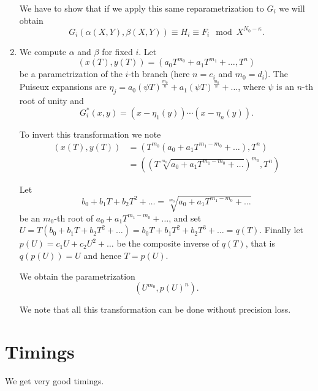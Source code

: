 \documentclass[a4paper,11pt,reqno]{amsart}%
\theoremstyle{definition}
\theoremstyle{plain}
\theoremstyle{remark}
\newcommand\ct[1]{\text{\rmfamily\upshape #1}}
\newcommand{\IntExpX}{\ct{IntExp}_X}
\newcommand{\IntExpY}{\ct{IntExp}_Y}
\begin{document}
\begin{enumerate}
We have to show that if we apply this same reparametrization to $G_i$ we will obtain
$$G_i(\alpha(X,Y), \beta(X,Y)) \equiv H_i \equiv F_i \mod X^{N_0 - \kappa}.$$

\item We compute $\alpha$ and $\beta$ for fixed $i$.
Let
$$(x(T), y(T)) = (a_0 T^{m_0} + a_1 T^{m_1} + \dots, T^n)$$
be a parametrization of the $i$-th branch (here $n = e_i$ and $m_0 = d_i$). The Puiseux expansions are $\eta_j = a_0 (\psi T)^{\frac{m_0}{n}} +  a_1 (\psi T)^{\frac{m_0}{n}} + \dots$, where $\psi$ is an $n$-th root of unity and
$$
G_i^*(x, y) = (x - \eta_1(y)) \cdots (x - \eta_n(y)).
$$

To invert this transformation we note
\begin{align*}
(x(T), y(T)) &= (T^{m_0} (a_0 + a_1 T^{m_1 - m_0} + \dots), T^n) \\
             &= \left(\left(T \sqrt[m_0]{a_0 + a_1 T^{m_1 - m_0} + \dots}\right)^{m_0}, T^n\right)
\end{align*}

Let
$$
b_0 + b_1 T + b_2 T^2 + \dots = \sqrt[m_0]{a_0 + a_1 T^{m_1 - m_0} + \dots}
$$
be an $m_0$-th root of $a_0 + a_1 T^{m_1 - m_0} + \dots$, 
and set $U = T (b_0  + b_1 T + b_2 T^2 + \dots) = b_0 T + b_1 T^2 + b_2 T^3 + \dots = q(T)$.
Finally let $p(U) = c_1 U + c_2 U^2 + \dots$ be the composite inverse of $q(T)$, that is $q(p(U)) = U$ and hence $T = p(U)$.

We obtain the parametrization
$$(U^{m_0}, p(U)^n).$$

We note that all this transformation can be done without precision loss.
%










\end{enumerate}






%


\section{Timings}

We get very good timings.



\end{document}
